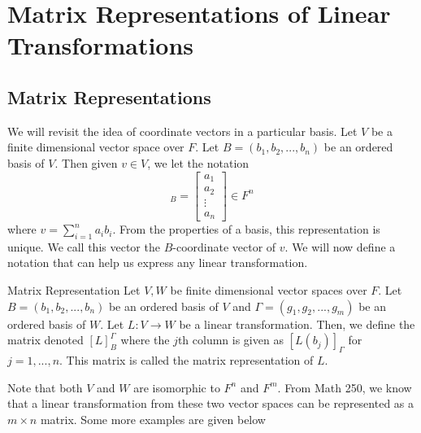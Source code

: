 \documentclass[main.tex]{subfiles}
\begin{document}
    \chapter{Matrix Representations of Linear Transformations}

    \section{Matrix Representations}

    We will revisit the idea of coordinate vectors in a particular basis. Let $V$ be a finite dimensional vector space over $F$. Let $B = (b_1, b_2, ..., b_n)$ be an ordered basis of $V$. Then given $v\in V$, we let the notation
    \begin{equation}
        [v]_B = \begin{bmatrix}
            a_1 \\ a_2 \\ \vdots \\a_n
        \end{bmatrix} \in F^n
    \end{equation}
    where $v = \sum_{i=1}^n a_ib_i$. From the properties of a basis, this representation is unique. We call this vector the $B$-coordinate vector of $v$. We will now define a notation that can help us express any linear transformation. 
    \begin{defn}{Matrix Representation}{}
        Let $V,W$ be finite dimensional vector spaces over $F$. Let $B = (b_1, b_2, ..., b_n)$ be an ordered basis of $V$ and $\Gamma = (g_1, g_2, ..., g_m)$ be an ordered basis of $W$. Let $L:V\to W$ be a linear transformation. Then, we define the matrix denoted $[L]_B^\Gamma$ where the $j$th column is given as $[L(b_j)]_\Gamma$ for $j = 1, ..., n$. This matrix is called the matrix representation of $L$.
    \end{defn}
    Note that both $V$ and $W$ are isomorphic to $F^n$ and $F^m$. From Math 250, we know that a linear transformation from these two vector spaces can be represented as a $m\times n$ matrix. Some more examples are given below 
\end{document}
